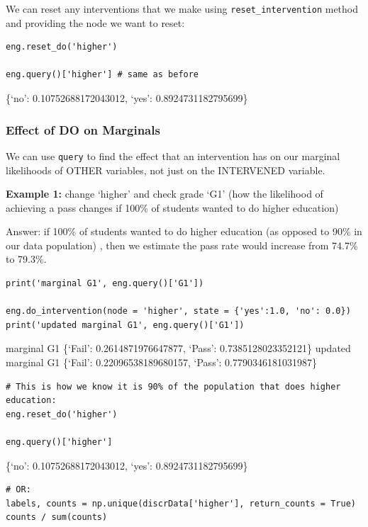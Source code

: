 \documentclass[
]{article}
\begin{document}
We can reset any interventions that we make using
\texttt{reset_intervention} method and providing the node
we want to reset:

\begin{verbatim}
eng.reset_do('higher')

eng.query()['higher'] # same as before
\end{verbatim}

\{`no': 0.10752688172043012, `yes': 0.8924731182795699\}

\hypertarget{effect-of-do-on-marginals}{%
\subsubsection{Effect of DO on
Marginals}\label{effect-of-do-on-marginals}}

We can use \texttt{query} to find the effect that an
intervention has on our marginal likelihoods of OTHER variables, not
just on the INTERVENED variable.

\textbf{Example 1:} change `higher' and check grade `G1' (how the
likelihood of achieving a pass changes if 100\% of students wanted to do
higher education)

Answer: if 100\% of students wanted to do higher education (as opposed
to 90\% in our data population) , then we estimate the pass rate would
increase from 74.7\% to 79.3\%.

\begin{verbatim}
print('marginal G1', eng.query()['G1'])

eng.do_intervention(node = 'higher', state = {'yes':1.0, 'no': 0.0})
print('updated marginal G1', eng.query()['G1'])
\end{verbatim}

marginal G1 \{`Fail': 0.2614871976647877, `Pass': 0.7385128023352121\}
updated marginal G1 \{`Fail': 0.22096538189680157, `Pass':
0.7790346181031987\}

\begin{verbatim}
# This is how we know it is 90% of the population that does higher education:
eng.reset_do('higher')

eng.query()['higher']
\end{verbatim}

\{`no': 0.10752688172043012, `yes': 0.8924731182795699\}

\begin{verbatim}
# OR:
labels, counts = np.unique(discrData['higher'], return_counts = True)
counts / sum(counts)
\end{verbatim}
\end{document}

